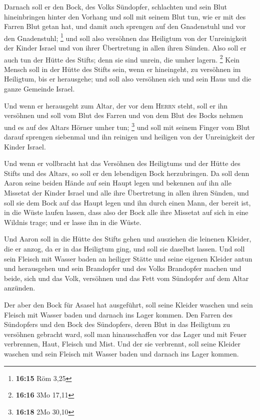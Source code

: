  Darnach soll er den Bock, des Volks Sündopfer,
schlachten und sein Blut hineinbringen hinter den Vorhang und soll mit
seinem Blut tun, wie er mit des Farren Blut getan hat, und damit auch
sprengen auf den Gnadenstuhl und vor den Gnadenstuhl; \footnote{\textbf{16:15}
  Röm 3,25}  und soll also versöhnen das Heiligtum von
der Unreinigkeit der Kinder Israel und von ihrer Übertretung in allen
ihren Sünden. Also soll er auch tun der Hütte des Stifts; denn sie sind
unrein, die umher lagern. \footnote{\textbf{16:16} 3Mo 17,11}
 Kein Mensch soll in der Hütte des Stifts sein, wenn er
hineingeht, zu versöhnen im Heiligtum, bis er herausgehe; und soll also
versöhnen sich und sein Haus und die ganze Gemeinde Israel.

 Und wenn er herausgeht zum Altar, der vor dem
\textsc{Herrn} steht, soll er ihn versöhnen und soll vom Blut des Farren
und von dem Blut des Bocks nehmen und es auf des Altars Hörner umher
tun; \footnote{\textbf{16:18} 2Mo 30,10}  und soll mit
seinem Finger vom Blut darauf sprengen siebenmal und ihn reinigen und
heiligen von der Unreinigkeit der Kinder Israel.

 Und wenn er vollbracht hat das Versöhnen des Heiligtums
und der Hütte des Stifts und des Altars, so soll er den lebendigen Bock
herzubringen.  Da soll denn Aaron seine beiden Hände auf
sein Haupt legen und bekennen auf ihn alle Missetat der Kinder Israel
und alle ihre Übertretung in allen ihren Sünden, und soll sie dem Bock
auf das Haupt legen und ihn durch einen Mann, der bereit ist, in die
Wüste laufen lassen,  dass also der Bock alle ihre
Missetat auf sich in eine Wildnis trage; und er lasse ihn in die Wüste.

 Und Aaron soll in die Hütte des Stifts gehen und
ausziehen die leinenen Kleider, die er anzog, da er in das Heiligtum
ging, und soll sie daselbst lassen.  Und soll sein
Fleisch mit Wasser baden an heiliger Stätte und seine eigenen Kleider
antun und herausgehen und sein Brandopfer und des Volks Brandopfer
machen und beide, sich und das Volk, versöhnen  und das
Fett vom Sündopfer auf dem Altar anzünden.

 Der aber den Bock für Asasel hat ausgeführt, soll seine
Kleider waschen und sein Fleisch mit Wasser baden und darnach ins Lager
kommen.  Den Farren des Sündopfers und den Bock des
Sündopfers, deren Blut in das Heiligtum zu versöhnen gebracht ward, soll
man hinausschaffen vor das Lager und mit Feuer verbrennen, Haut, Fleisch
und Mist.  Und der sie verbrennt, soll seine Kleider
waschen und sein Fleisch mit Wasser baden und darnach ins Lager kommen.

